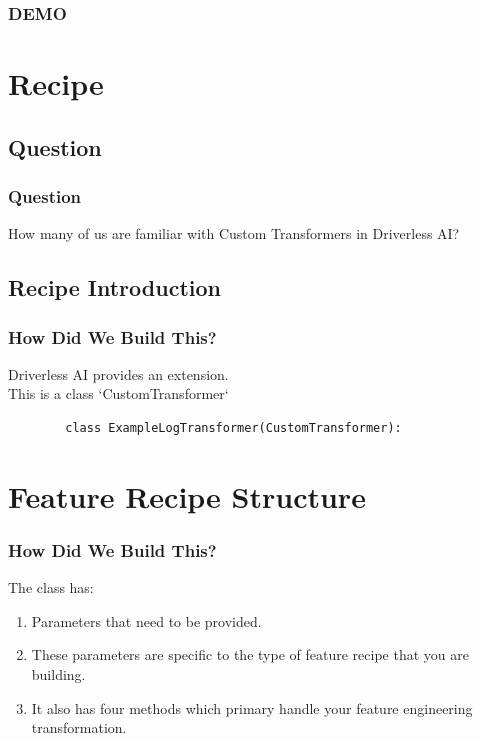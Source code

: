 \documentclass[11pt,
               aspectratio=169,
               hyperref={colorlinks}
               ]{beamer}
\begin{document}
	\begin{frame}
		\frametitle{DEMO}
	\end{frame}
\section{Recipe}
	\subsection{Question}
	\begin{frame}
		\frametitle{Question}
		How many of us are familiar with Custom Transformers in Driverless AI?
	\end{frame}
	\subsection{Recipe Introduction}
	\begin{frame}[fragile]
		\frametitle{How Did We Build This?}
		Driverless AI provides an extension. \\
		This is a class `CustomTransformer`
		\begin{verbatim}
		class ExampleLogTransformer(CustomTransformer):
		\end{verbatim}
\end{frame}
		\section{Feature Recipe Structure}
	\begin{frame}[fragile]
		\frametitle{How Did We Build This?}
		The class has:
		\begin{enumerate}
			\item Parameters that need to be provided. 
			\item These parameters are specific to the type of feature recipe that you are building. 
			\item It also has four methods which primary handle your feature engineering transformation. 
		\end{enumerate}
			
\end{frame}
\end{document}
